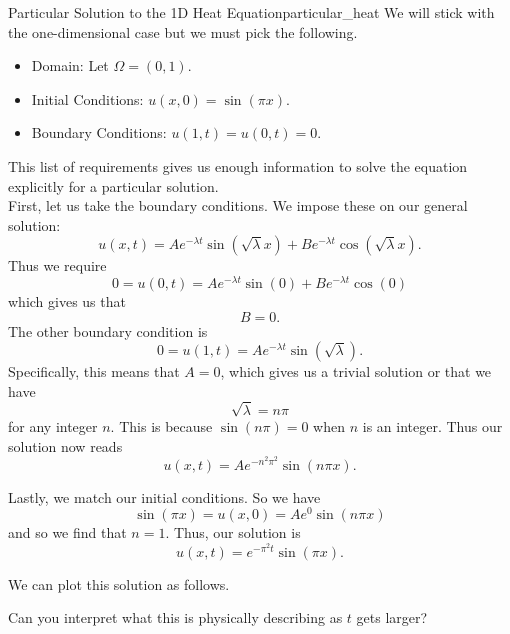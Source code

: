        \begin{ex}{Particular Solution to the 1D Heat Equation}{particular_heat}
        We will stick with the one-dimensional case but we must pick the following.  
        \begin{itemize}
            \item Domain: Let $\Omega = (0,1)$.
            \item Initial Conditions: $u(x,0)=\sin(\pi x)$.
            \item Boundary Conditions: $u(1,t)=u(0,t)=0$.  
        \end{itemize}
        This list of requirements gives us enough information to solve the equation explicitly for a particular solution.\\
        
        First, let us take the boundary conditions. We impose these on our general solution:
        \[
        u(x,t)=Ae^{-\lambda t}\sin(\sqrt{\lambda}x)+Be^{-\lambda t}\cos(\sqrt{\lambda}x).
        \]
        Thus we require
        \[
        0=u(0,t)=Ae^{-\lambda t}\sin(0)+Be^{-\lambda t}\cos(0)
        \]
        which gives us that
        \[
        B=0.
        \]
        The other boundary condition is
        \[
        0=u(1,t)=Ae^{-\lambda t}\sin(\sqrt{\lambda}).
        \]
        Specifically, this means that $A=0$, which gives us a trivial solution or that we have
        \[
        \sqrt{\lambda}=n\pi
        \]
        for any integer $n$.  This is because $\sin(n\pi)=0$ when $n$ is an integer. Thus our solution now reads
        \[
        u(x,t)=Ae^{-n^2\pi^2}\sin(n\pi x).
        \]
        
        Lastly, we match our initial conditions.  So we have
        \[
        \sin(\pi x)=u(x,0)=A e^0 \sin(n\pi x)
        \]
        and so we find that $n=1$.  Thus, our solution is
        \[
        \boxed{u(x,t)=e^{-\pi^2 t} \sin(\pi x).}
        \] 
        
        We can plot this solution as follows.
        \begin{figure}[H]
        	\centering
        	\def\svgwidth{0.75\columnwidth}
        	
        \end{figure}
        \end{ex}
        
        \begin{exercise}
        Can you interpret what this is physically describing as $t$ gets larger?
        \end{exercise}
        
